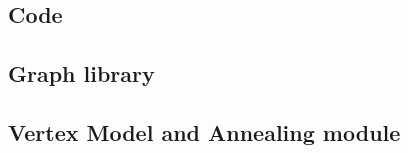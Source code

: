\begin{appendices}
  \chapter{Code}
  \section{Graph library}
  
  \section{Vertex Model and Annealing module}
  
\end{appendices}
